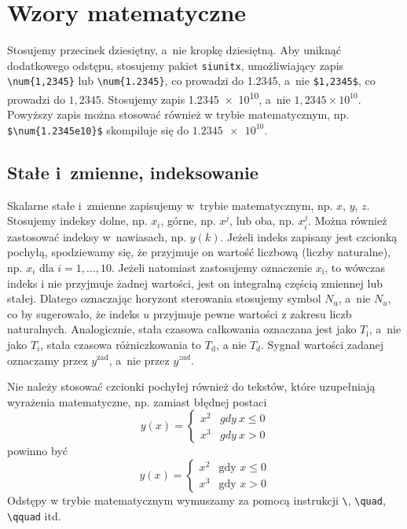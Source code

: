 \chapter{Wzory matematyczne}
Stosujemy przecinek dziesiętny, a~nie kropkę dziesiętną. Aby uniknąć dodatkowego odstępu, stosujemy pakiet \verb+siunitx+, umożliwiający zapis \verb+\num{1,2345}+ lub \verb+\num{1.2345}+, co prowadzi do \num{1,2345}, a~nie \verb+$1,2345$+, co prowadzi do $1,2345$. Stosujemy zapis \num{1.2345e10}, a~nie $1{,}2345\times 10^{10}$. Powyższy zapis można stosować również w trybie matematycznym, np. \verb+$\num{1.2345e10}$+ skompiluje się do $\num{1.2345e10}$.

\section{Stałe i~zmienne, indeksowanie}
Skalarne stałe i~zmienne zapisujemy w~trybie matematycznym, np. $x$, $y$, $z$. Stosujemy indeksy dolne, np. $x_i$, górne, np. $x^j$, lub oba, np. $x_i^j$. Można również zastosować indeksy w~nawiasach, np. $y(k)$. Jeżeli indeks zapisany jest czcionką pochyłą, spodziewamy się, że przyjmuje on wartość liczbową (liczby naturalne), np. $x_i$ dla $i=1,\ldots,10$. Jeżeli natomiast zastosujemy oznaczenie $x_{\mathrm{i}}$, to wówczas indeks $\mathrm{i}$ nie przyjmuje żadnej wartości, jest on integralną częścią zmiennej lub stałej. Dlatego oznaczając horyzont sterowania stosujemy symbol $N_{\mathrm{u}}$, a~nie $N_u$, co by sugerowało, że indeks $u$ przyjmuje pewne wartości z zakresu liczb naturalnych. Analogicznie, stała czasowa całkowania oznaczana jest jako $T_{\mathrm{i}}$, a~nie jako $T_i$, stała czasowa różniczkowania to $T_{\mathrm{d}}$, a nie $T_d$. Sygnał wartości zadanej oznaczamy przez $y^{\mathrm{zad}}$, a~nie przez $y^{zad}$.

Nie należy stosować czcionki pochyłej również do tekstów, które uzupełniają wyrażenia matematyczne, np. zamiast błędnej postaci
\begin{equation}
y(x)=
\begin{cases}
x^2 & gdy \ x\le 0\\
x^3 & gdy \ x>0
\end{cases}
\nonumber
\end{equation}
powinno być
\begin{equation}
y(x)=
\begin{cases}
x^2 & \textrm{gdy } x\le 0\\
x^3 & \textrm{gdy } x>0
\end{cases}
\nonumber
\end{equation}
Odstępy w trybie matematycznym wymuszamy za pomocą instrukcji \verb+\+, \verb+\quad+, \verb+\qquad+ itd.

